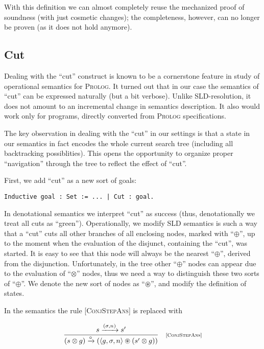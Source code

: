 With this definition we can almost completely reuse the mechanized proof of soundness (with just cosmetic changes); the completeness, however,
can no longer be proven (as it does not hold anymore).

\subsection{Cut}

Dealing with the ``cut'' construct is known to be a cornerstone feature in study of operational semantics for \textsc{Prolog}. It turned out that
in our case the semantics of ``cut'' can be expressed naturally (but a bit verbose). Unlike SLD-resolution, it does not amount to an incremental
change in semantics description. It also would work only for programs, directly converted from \textsc{Prolog} specifications.

The key observation in dealing with the ``cut'' in our settings is that a state in our semantics in fact encodes the whole current
search tree (including all backtracking possiblities). This opens the opportunity to organize proper ``navigation'' through the tree
to reflect the effect of ``cut''.

First, we add ``cut'' as a new sort of goals:

\begin{lstlisting}[language=Coq,basicstyle=\footnotesize]
  Inductive goal : Set := ... | Cut : goal.
\end{lstlisting}

In denotational semantics we interpret ``cut'' as success (thus, denotationally we treat all cuts as ``green''). Operationally, we
modify SLD semantics is such a way that a ``cut'' cuts all other branches of all enclosing nodes, marked with ``$\oplus$'', up to
the moment when the evaluation of the disjunct, containing the ``cut'', was started. It is easy to see that this node will always
be the nearest ``$\oplus$'', derived from the disjunction. Unfortunately, in the tree other ``$\oplus$'' nodes can
appear due to the evaluation of ``$\otimes$'' nodes, thus we need a way to distinguish these two sorts of ``$\oplus$''. We
denote the new sort of nodes as ``$\circledast$'', and modify the definition of states.

In the semantics the rule \textsc{[ConjStepAns]} is replaced with

\[
\begin{array}{cr}
  \dfrac{s \xrightarrow{(\sigma, n)} s'}{(s \otimes g) \xrightarrow{\circ} (\left<{g, \sigma, n}\right> \circledast (s' \otimes g))} & \mbox{\scriptsize{[\textsc{ConjStepAns}]}} 
\end{array}
\]

